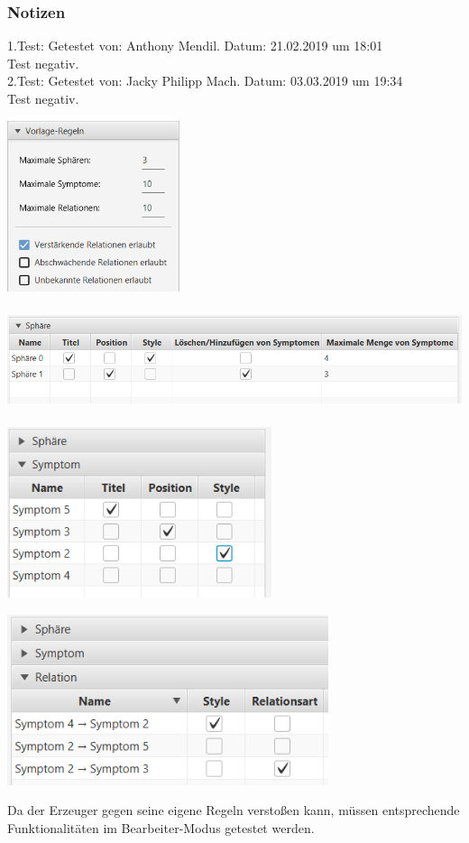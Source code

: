 \documentclass[enabledeprecatedfontcommands]{scrartcl}
\begin{document}
\subsubsection{Notizen}
1.Test: Getestet von: Anthony Mendil. Datum: 21.02.2019 um 18:01 \\
Test negativ. \\
2.Test: Getestet von: Jacky Philipp Mach. Datum: 03.03.2019 um 19:34 \\
Test negativ.
\begin{center}
\includegraphics[height=5cm]{template4.png}
\end{center}
\begin{center}
\includegraphics[height=3cm]{template1.PNG}
\end{center}
\begin{center}
\includegraphics[height=5cm]{template2.PNG}
\end{center}
\begin{center}
\includegraphics[height=5cm]{template3.png}
\end{center}
Da der Erzeuger gegen seine eigene Regeln verstoßen kann, müssen entsprechende Funktionalitäten im Bearbeiter-Modus getestet werden.
\end{document}
